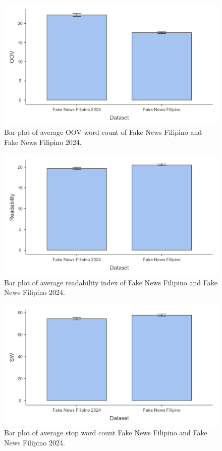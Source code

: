 \begin{figure}[h!]
    \centering
    \includegraphics[width=\textwidth,height=\textheight, keepaspectratio]{figures/stats/oov_data.png}
        \caption{Bar plot of average OOV word count of Fake News Filipino and Fake News Filipino 2024.}
        \label{fig:oov_data}
\end{figure}
\begin{figure}[h!]
    \centering
    \includegraphics[width=\textwidth,height=\textheight, keepaspectratio]{figures/stats/read_data.png}
        \caption{Bar plot of average readability index of Fake News Filipino and Fake News Filipino 2024.}
        \label{fig:read_data}
\end{figure}
\begin{figure}[h!]
    \centering
    \includegraphics[width=\textwidth,height=\textheight, keepaspectratio]{figures/stats/sw_data.png}
        \caption{Bar plot of average stop word count Fake News Filipino and Fake News Filipino 2024.}
        \label{fig:sw_data}
\end{figure}

